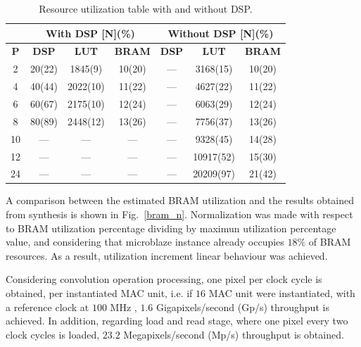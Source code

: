 \documentclass[conference,compsoc]{IEEEtran}
\begin{document}
\begin{table}[!t]
\renewcommand{\arraystretch}{1.3}
\caption{Resource utilization table with and without DSP.}
\label{res_table}
\centering
\begin{tabular}{|c|c|c|c|c|c|c|}
  \hline
  & \multicolumn{3}{c|}{\textbf{With DSP [N](\%)}} & \multicolumn{3}{c|}{\textbf{Without DSP [N](\%)}} \\ \hline
  \textbf{P}  & \textbf{DSP}            & \textbf{LUT}        & \textbf{BRAM}       & \textbf{DSP}         & \textbf{LUT}           & \textbf{BRAM}         \\ \hline
  2  & 20(22)         & 1845(9)    & 10(20)     & ---         & 3168(15)      & 10(20)         \\ \hline
  4  & 40(44)         & 2022(10)   & 11(22)     & ---         & 4627(22)      & 11(22)         \\ \hline
  6  & 60(67)         & 2175(10)   & 12(24)     & ---         & 6063(29)      & 12(24)         \\ \hline
  8  & 80(89)         & 2448(12)   & 13(26)     & ---         & 7756(37)      & 13(26)         \\ \hline
  10 & ---            & ---        & ---        & ---         & 9328(45)      & 14(28)         \\ \hline
  12 & ---            & ---        & ---        & ---         & 10917(52)     & 15(30)         \\ \hline
  24 & ---            & ---        & ---        & ---         & 20209(97)     & 21(42)         \\ \hline
\end{tabular}           
\end{table}

A comparison between the estimated BRAM utilization and the results obtained
from synthesis is shown in Fig.~\ref{bram_n}. Normalization was made with
respect to BRAM utilization percentage dividing by maximun utilization
percentage value, and considering that microblaze instance already occupies $18\%$
of BRAM resources. As a result, utilization increment linear behaviour was
achieved.

Considering convolution operation processing, one pixel per clock cycle is
obtained, per instantiated MAC unit, i.e. if $16$ MAC unit were instantiated,
with a reference clock at $100$ MHz , $1.6$ Gigapixels/second (Gp/s) throughput
is achieved. In addition, regarding load and read stage, where one pixel every
two clock cycles is loaded, $23.2$ Megapixels/second (Mp/s) throughput is
obtained.
\end{document}
